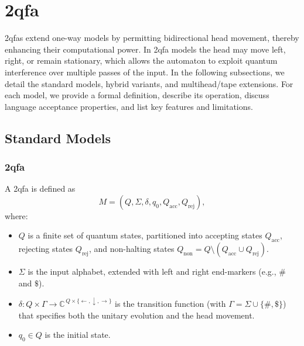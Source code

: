 \section{\acrfull{2qfa}}
\label{sec:two-way-qfas}

\glspl{2qfa} extend one-way models by permitting bidirectional head movement, thereby enhancing their computational power. In \gls{2qfa} models the head may move left, right, or remain stationary, which allows the automaton to exploit quantum interference over multiple passes of the input. In the following subsections, we detail the standard models, hybrid variants, and multihead/tape extensions. For each model, we provide a formal definition, describe its operation, discuss language acceptance properties, and list key features and limitations.

\subsection{Standard Models}
\label{subsec:two-way-standard}

\subsubsection{\acrfull{2qfa}}
\label{sssec:2qfa}
\begin{definition}
A \gls{2qfa} is defined as 
\[
M = (Q, \Sigma, \delta, q_0, Q_{\text{acc}}, Q_{\text{rej}}),
\]
where:
\begin{itemize}
    \item \( Q \) is a finite set of quantum states, partitioned into accepting states \( Q_{\text{acc}} \), rejecting states \( Q_{\text{rej}} \), and non-halting states \( Q_{\text{non}} = Q \setminus (Q_{\text{acc}} \cup Q_{\text{rej}}) \).
    \item \( \Sigma \) is the input alphabet, extended with left and right end-markers (e.g., \( \# \) and \( \$ \)).
    \item \( \delta: Q \times \Gamma \to \mathbb{C}^{\, Q \times \{ \leftarrow, \downarrow, \rightarrow \}} \) is the transition function (with \( \Gamma = \Sigma \cup \{ \#, \$ \} \)) that specifies both the unitary evolution and the head movement.
    \item \( q_0 \in Q \) is the initial state.
\end{itemize}
\end{definition}

